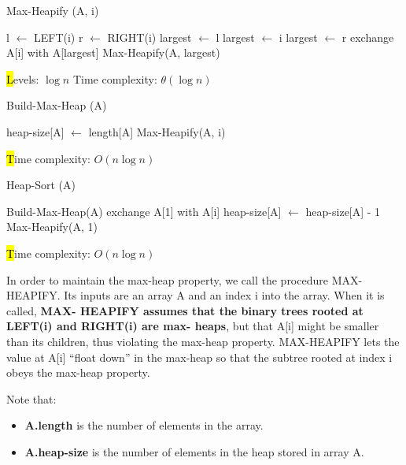 \begin{algorithm}[H]
    \caption{Max-Heapify (A, i)}
    \begin{algorithmic}[1]
        \State l $\gets$ LEFT(i)
        \State r $\gets$ RIGHT(i)
            \State largest $\gets$ l
        \Else
            \State largest $\gets$ i
        \EndIf
            \State largest $\gets$ r
        \EndIf
            \State exchange A[i] with A[largest]
            \State Max-Heapify(A, largest)
        \EndIf
    \end{algorithmic}
    \hl
    Levels: $\log n$
    Time complexity: $\theta(\log n)$
\end{algorithm}

\begin{algorithm}[H]
    \caption{Build-Max-Heap (A)}
    \begin{algorithmic}[1]
        \State heap-size[A] $\gets$ length[A]
            \State Max-Heapify(A, i)
        \EndFor
    \end{algorithmic}
    \hl
    Time complexity: $O(n\log n)$
\end{algorithm}

\begin{algorithm}[H]
    \caption{Heap-Sort (A)}
    \begin{algorithmic}[1]
        \State Build-Max-Heap(A) 
         
            \State exchange A[1] with A[i]
            \State heap-size[A] $\gets$ heap-size[A] - 1
            \State Max-Heapify(A, 1) 
        \EndFor
    \end{algorithmic}
    \hl
    Time complexity: $O(n\log n)$
\end{algorithm}

In order to maintain the max-heap property, we call the procedure MAX-HEAPIFY.
Its inputs are an array A and an index i into the array. When it is called, \textbf{MAX-
HEAPIFY assumes that the binary trees rooted at LEFT(i) and RIGHT(i) are max-
heaps}, but that A[i] might be smaller than its children, thus violating the max-heap
property. MAX-HEAPIFY lets the value at A[i] “float down” in the max-heap so
that the subtree rooted at index i obeys the max-heap property.

Note that:
\begin{itemize}
    \item \textbf{A.length} is the number of elements in the array.
    \item \textbf{A.heap-size} is the number of elements in the heap stored in array A.
\end{itemize}

